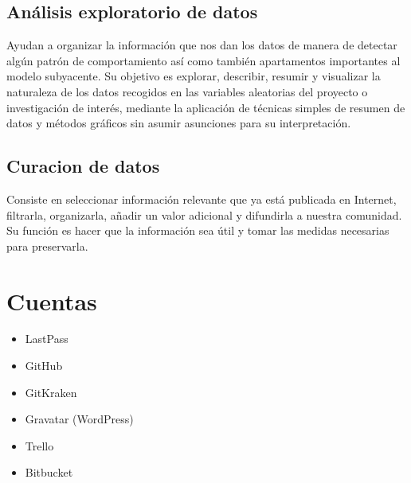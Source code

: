 \documentclass[12pt,letterpaper]{article}
\begin{document}
\subsection*{An\'alisis exploratorio de datos}
Ayudan a organizar la informaci\'on que nos dan los datos de manera de detectar alg\'un patr\'on de comportamiento as\'i como tambi\'en apartamentos importantes al modelo subyacente.
Su objetivo es explorar, describir, resumir y visualizar la naturaleza de los datos recogidos en las variables aleatorias del proyecto o investigaci\'on de inter\'es, mediante la aplicaci\'on de t\'ecnicas simples de resumen de datos y m\'etodos gr\'aficos sin asumir asunciones para su interpretaci\'on.

\subsection*{Curacion de datos}
Consiste en seleccionar informaci\'on relevante que ya est\'a publicada en Internet, filtrarla, organizarla, añadir un valor adicional y difundirla a nuestra comunidad.
Su funci\'on es hacer que la informaci\'on sea \'util y tomar las medidas necesarias para preservarla. \cite{Webinar}

\section{Cuentas}
\begin{itemize}
\item LastPass
\item GitHub
\item GitKraken
\item Gravatar (WordPress)
\item Trello
\item Bitbucket
\end{itemize}

 





\end{document}
